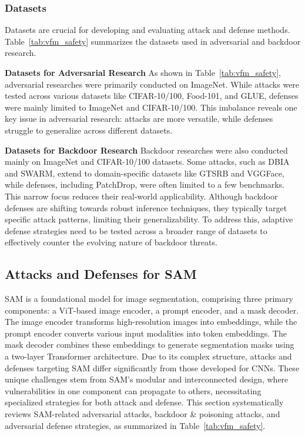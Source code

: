 \subsubsection{Datasets}\label{sec:ViT-dataset}
Datasets are crucial for developing and evaluating attack and defense methods. Table~\ref{tab:vfm_safety} summarizes the datasets used in adversarial and backdoor research.

\textbf{Datasets for Adversarial Research} As shown in Table~\ref{tab:vfm_safety}, adversarial researches were primarily conducted on ImageNet. While attacks were tested across various datasets like CIFAR-10/100, Food-101, and GLUE, defenses were mainly limited to ImageNet and CIFAR-10/100. This imbalance reveals one key issue in adversarial research: attacks are more versatile, while defenses struggle to generalize across different datasets.

\textbf{Datasets for Backdoor Research} Backdoor researches were also conducted mainly on ImageNet and CIFAR-10/100 datasets. Some attacks, such as DBIA and SWARM, extend to domain-specific datasets like GTSRB and VGGFace, while defenses, including PatchDrop, were often limited to a few benchmarks. This narrow focus reduces their real-world applicability. 
Although backdoor defenses are shifting towards robust inference techniques, they typically target specific attack patterns, limiting their generalizability. To address this, adaptive defense strategies need to be tested across a broader range of datasets to effectively counter the evolving nature of backdoor threats.





\subsection{Attacks and Defenses for SAM}\label{sec:vfm_sam}
SAM is a foundational model for image segmentation, comprising three primary components: a ViT-based image encoder, a prompt encoder, and a mask decoder. The image encoder transforms high-resolution images into embeddings, while the prompt encoder converts various input modalities into token embeddings. The mask decoder combines these embeddings to generate segmentation masks using a two-layer Transformer architecture.
Due to its complex structure, attacks and defenses targeting SAM differ significantly from those developed for CNNs. These unique challenges stem from SAM's modular and interconnected design, where vulnerabilities in one component can propagate to others, necessitating specialized strategies for both attack and defense. 
This section systematically reviews SAM-related adversarial attacks, backdoor \& poisoning attacks, and adversarial defense strategies, as summarized in Table~\ref{tab:vfm_safety}.





